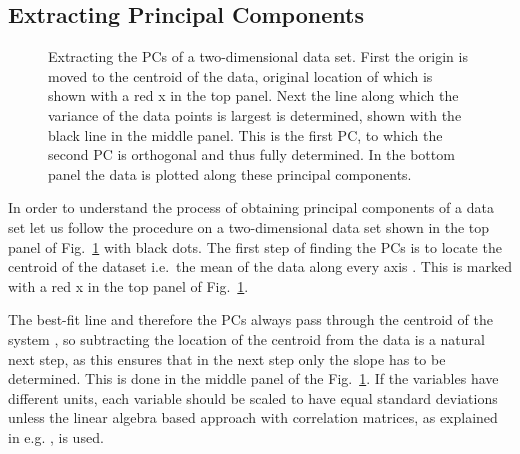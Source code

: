 \documentclass[english, oneside]{HYgradu}
\begin{document}
\subsection{Extracting Principal Components}
\begin{figure}
    \centering
    
    \caption{Extracting the PCs of a two-dimensional data set. First the origin is moved to the centroid of the data, original location of which is shown with a red x in the top panel. Next the line along which the variance of the data points is largest is determined, shown with the black line in the middle panel. This is the first PC, to which the second PC is orthogonal and thus fully determined. In the bottom panel the data is plotted along these principal components.
    }\label{fig:pca-illustrated}
\end{figure}

In order to understand the process of obtaining principal components of a data set let us follow the procedure on a two-dimensional data set shown in the top panel of Fig.\ \ref{fig:pca-illustrated} with black dots. The first step of finding the PCs is to locate the centroid of the dataset i.e.\ the mean of the data along every axis \citep{smith2002tutorial}. This is marked with a red x in the top panel of Fig.\ \ref{fig:pca-illustrated}.

The best-fit line and therefore the PCs always pass through the centroid of the system \citep{pearson1901lines}, so subtracting the location of the centroid from the data is a natural next step, as this ensures that in the next step only the slope has to be determined. This is done in the middle panel of the Fig.\ \ref{fig:pca-illustrated}. If the variables have different units, each variable should be scaled to have equal standard deviations \citep{james2013introduction} unless the linear algebra based approach with correlation matrices, as explained in e.g. \citet{jolliffe2002principal}, is used.
\end{document}
